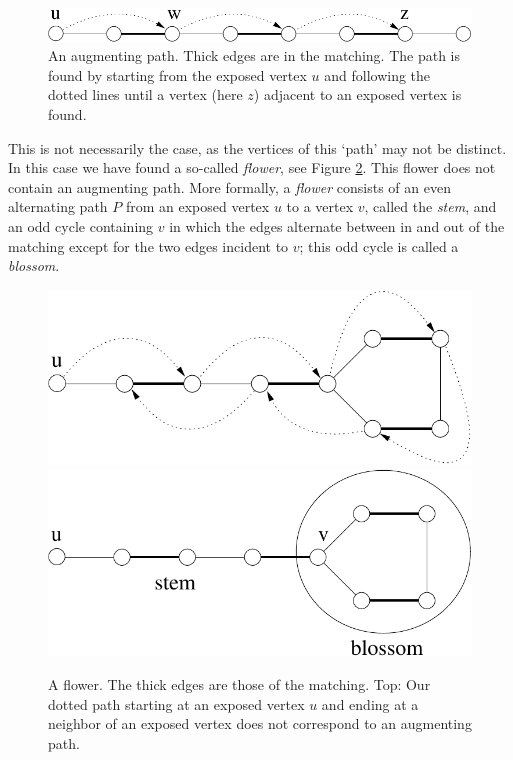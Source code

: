 \documentclass[12pt]{article}
\begin{document}
\begin{figure}[htbp]
\begin{center}
\includegraphics{../figures/augpath}
\end{center}
\caption{\label{fig-augm} An augmenting path. Thick edges are in the
  matching. The path is found by starting from the exposed vertex $u$
  and following the dotted lines until a vertex (here $z$) adjacent to
  an exposed vertex is found. }
\end{figure}

This is not necessarily the case, as the vertices of this `path' may
not be distinct. In this case we have found a so-called  {\it
  flower}, see Figure \ref{flower}. This flower does not contain an
augmenting path. More formally, a {\it flower} consists of an even
alternating path $P$ from an exposed vertex $u$ to a vertex $v$,
called the {\it stem}, and an odd cycle containing $v$ in which the
edges alternate between in and out of the matching except for the two
edges incident to $v$; this odd cycle is called a {\it blossom}.    

\begin{figure}[htbp]
\begin{center}
\includegraphics{../figures/flower3}
\includegraphics{../figures/flower2}
\end{center}
\caption{\label{flower} A flower. The thick edges are those of the
  matching. Top: Our dotted path starting at an exposed vertex $u$ and
  ending at a neighbor of an exposed vertex does not correspond to an
  augmenting path. }
\end{figure}
\end{document}
